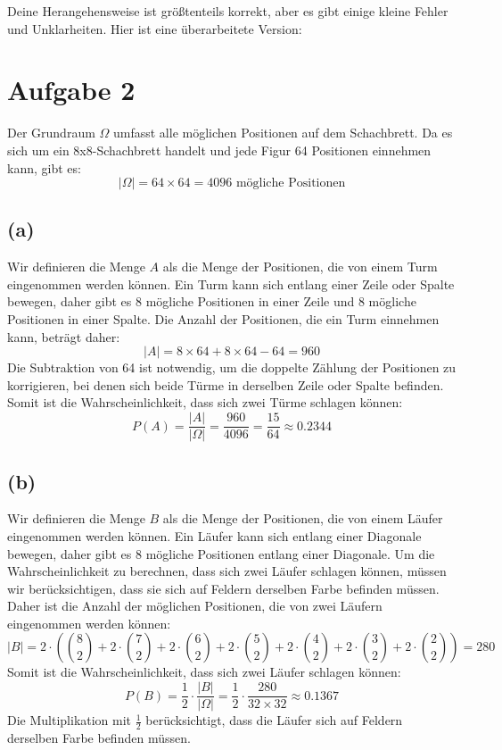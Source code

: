 \documentclass[a4paper]{scrartcl}
\begin{document}
Deine Herangehensweise ist größtenteils korrekt, aber es gibt einige kleine Fehler und Unklarheiten. Hier ist eine überarbeitete Version:

\section*{Aufgabe 2}
Der Grundraum \( \Omega \) umfasst alle möglichen Positionen auf dem Schachbrett. Da es sich um ein 8x8-Schachbrett handelt und jede Figur 64 Positionen einnehmen kann, gibt es:
\[
  |\Omega| = 64 \times 64 = 4096 \text{ mögliche Positionen}
\]

\subsection*{(a)}
Wir definieren die Menge \( A \) als die Menge der Positionen, die von einem Turm eingenommen werden können. Ein Turm kann sich entlang einer Zeile oder Spalte bewegen, daher gibt es 8 mögliche Positionen in einer Zeile und 8 mögliche Positionen in einer Spalte.
Die Anzahl der Positionen, die ein Turm einnehmen kann, beträgt daher:
\[
  |A| = 8 \times 64 + 8 \times 64 - 64 = 960
\]
Die Subtraktion von 64 ist notwendig, um die doppelte Zählung der Positionen zu korrigieren, bei denen sich beide Türme in derselben Zeile oder Spalte befinden.
Somit ist die Wahrscheinlichkeit, dass sich zwei Türme schlagen können:
\[
  P(A) = \frac{|A|}{|\Omega|} = \frac{960}{4096} = \frac{15}{64} \approx 0.2344 
\]

\subsection*{(b)}
Wir definieren die Menge \( B \) als die Menge der Positionen, die von einem Läufer eingenommen werden können. Ein Läufer kann sich entlang einer Diagonale bewegen, daher gibt es 8 mögliche Positionen entlang einer Diagonale.
Um die Wahrscheinlichkeit zu berechnen, dass sich zwei Läufer schlagen können, müssen wir berücksichtigen, dass sie sich auf Feldern derselben Farbe befinden müssen. Daher ist die Anzahl der möglichen Positionen, die von zwei Läufern eingenommen werden können:
\[
  |B| = 2 \cdot \left(\binom{8}{2} + 2 \cdot \binom{7}{2} + 2 \cdot \binom{6}{2} + 2 \cdot \binom{5}{2} + 2 \cdot \binom{4}{2} + 2 \cdot \binom{3}{2} + 2 \cdot \binom{2}{2}\right) = 280
\]
Somit ist die Wahrscheinlichkeit, dass sich zwei Läufer schlagen können:
\[
  P(B) = \frac{1}{2} \cdot \frac{|B|}{|\Omega|} = \frac{1}{2} \cdot \frac{280}{32 \times 32} \approx 0.1367
\]
Die Multiplikation mit \( \frac{1}{2} \) berücksichtigt, dass die Läufer sich auf Feldern derselben Farbe befinden müssen.
\end{document}
